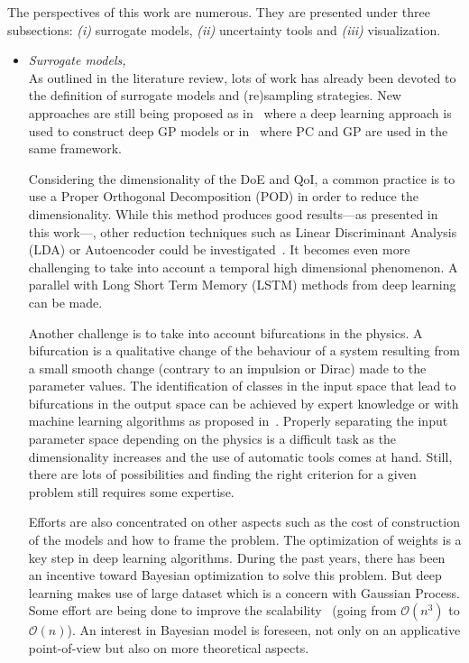 
The perspectives of this work are numerous. They are presented under three subsections: \emph{(i)} surrogate models, \emph{(ii)} uncertainty tools and \emph{(iii)} visualization.

\begin{itemize}
\item \emph{Surrogate models,}\hfill\\
As outlined in the literature review, lots of work has already been devoted to the definition of surrogate models and (re)sampling strategies. New approaches are still being proposed as in~\cite{raissi2016} where a deep learning approach is used to construct deep GP models or in~\cite{Schoebi2015} where PC and GP are used in the same framework.

Considering the dimensionality of the DoE and QoI, a common practice is to use a Proper Orthogonal Decomposition (POD) in order to reduce the dimensionality. While this method produces good results---as presented in this work---, other reduction techniques such as Linear Discriminant Analysis (LDA) or Autoencoder could be investigated~\cite{Goodfellow2016}. It becomes even more challenging to take into account a temporal high dimensional phenomenon. A parallel with Long Short Term Memory (LSTM) methods from deep learning can be made.

Another challenge is to take into account bifurcations in the physics. A bifurcation is a qualitative change of the behaviour of a system resulting from a small smooth change (contrary to an impulsion or Dirac) made to the parameter values. The identification of classes in the input space that lead to bifurcations in the output space can be achieved by expert knowledge or with  machine learning algorithms as proposed in~\cite{Dupuis2018}. Properly separating the input parameter space depending on the physics is a difficult task as the dimensionality increases and the use of automatic tools comes at hand. Still, there are lots of possibilities and finding the right criterion for a given problem still requires some expertise.

Efforts are also concentrated on other aspects such as the cost of construction of the models and how to frame the problem. The optimization of weights is a key step in deep learning algorithms. During the past years, there has been an incentive toward Bayesian optimization to solve this problem. But deep learning makes use of large dataset which is a concern with Gaussian Process. Some effort are being done to improve the scalability~\cite{Wilson2015} (going from $\mathcal{O}(n^3)$ to $\mathcal{O}(n)$). An interest in Bayesian model is foreseen, not only on an applicative point-of-view but also on more theoretical aspects.


\end{itemize}
